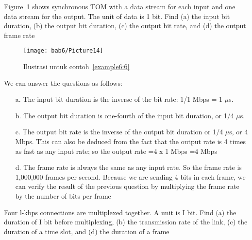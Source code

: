 \vspace{12pt}

\begin{example}
  Figure~\ref{fig6:13} shows synchronous TOM with a data stream for each input and one data stream for the output. The unit of data is 1 bit. Find (a) the input bit duration, (b) the output bit duration, (c) the output bit rate, and (d) the output frame rate
  \label{example6:6}
\end{example}

\begin{figure}[htbp]
  \centering
  \texttt{[image: bab6/Picture14]}
  \caption{Ilustrasi untuk contoh~\ref{example6:6}}
  \label{fig6:13}
\end{figure}

\begin{solution}
  We can answer the questions as follows:
  \begin{itemize}
    \item[a.] The input bit duration is the inverse of the bit rate: 1/1 Mbps = 1 $\mu$s.
    \item[b.] The output bit duration is one-fourth of the input bit duration, or 1/4 $\mu$s.
    \item[c.] The output bit rate is the inverse of the output bit duration or 1/4 $\mu$s, or 4 Mbps. This can also be deduced from the fact that the output rate is 4 times as fast as any input rate; so the output rate =4 x 1 Mbps =4 Mbps
    \item[d.] The frame rate is always the same as any input rate. So the frame rate is 1,000,000 frames per second. Because we are sending 4 bits in each frame, we can verify the result of the previous question by multiplying the frame rate by the number of bits per frame
  \end{itemize}
\end{solution}

\vspace{12pt}

\begin{example}
  Four l-kbps connections are multiplexed together. A unit is I bit. Find (a) the duration of I bit before multiplexing, (b) the transmission rate of the link, (c) the duration of a time slot, and (d) the duration of a frame
  \label{example6:7}
\end{example}

